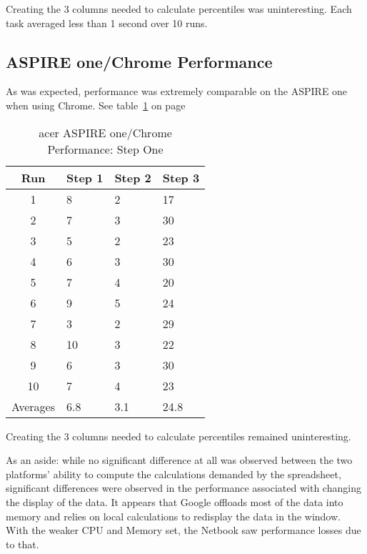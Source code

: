 Creating the 3 columns needed to calculate percentiles was uninteresting.  Each
task averaged less than 1 second over 10 runs.

\subsection{ASPIRE one/Chrome Performance}

As was expected, performance was extremely comparable on the ASPIRE one when
using Chrome. See table~\ref{aspChrPerf} on page~\pageref{aspChrPerf}

\begin{table}
  \begin{tabular}{| c | l | l | l |}
    \hline
    Run          & Step 1 & Step 2 & Step 3 \\ \hline
    1            & 8      & 2      & 17     \\ \hline
    2            & 7      & 3      & 30     \\ \hline
    3            & 5      & 2      & 23     \\ \hline
    4            & 6      & 3      & 30     \\ \hline
    5            & 7      & 4      & 20     \\ \hline
    6            & 9      & 5      & 24     \\ \hline
    7            & 3      & 2      & 29     \\ \hline
    8            & 10     & 3      & 22     \\ \hline
    9            & 6      & 3      & 30     \\ \hline
    10           & 7      & 4      & 23     \\ \hline
    Averages     & 6.8    & 3.1    & 24.8   \\
    \hline
  \end{tabular}
  \caption{acer ASPIRE one/Chrome Performance: Step One}
  \label{aspChrPerf}
\end{table}

Creating the 3 columns needed to calculate percentiles remained uninteresting.

As an aside: while no significant difference at all was observed between the
two platforms' ability to compute the calculations demanded by the spreadsheet,
significant differences were observed in the performance associated with
changing the display of the data.  It appears that Google offloads most of the
data into memory and relies on local calculations to redisplay the data in the
window.  With the weaker CPU and Memory set, the Netbook saw performance losses
due to that.

